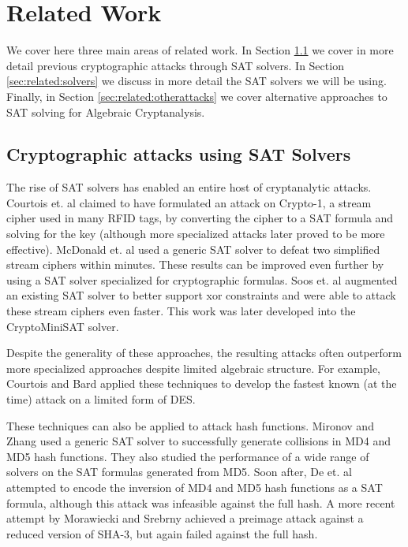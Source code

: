 \section{Related Work}
\label{sec:related}
We cover here three main areas of related work. In Section \ref{sec:related:satattacks} we cover in more detail previous cryptographic attacks through SAT solvers. In Section \ref{sec:related:solvers} we discuss in more detail the SAT solvers we will be using. Finally, in Section \ref{sec:related:otherattacks} we cover alternative approaches to SAT solving for Algebraic Cryptanalysis. 

\subsection{Cryptographic attacks using SAT Solvers}
\label{sec:related:satattacks}
The rise of SAT solvers has enabled an entire host of cryptanalytic attacks. Courtois et. al \cite{CNO08} claimed to have formulated an attack on Crypto-1, a stream cipher used in many RFID tags, by converting the cipher to a SAT formula and solving for the key (although more specialized attacks \cite{GGMRVSJ08} later proved to be more effective). McDonald et. al \cite{MCP07} used a generic SAT solver to defeat two simplified stream ciphers within minutes. These results can be improved even further by using a SAT solver specialized for cryptographic formulas. Soos et. al \cite{SNC09} augmented an existing SAT solver to better support xor constraints and were able to attack these stream ciphers even faster. This work was later developed into the {CryptoMiniSAT} solver.

Despite the generality of these approaches, the resulting attacks often outperform more specialized approaches despite limited algebraic structure. For example, Courtois and Bard \cite{CB07} applied these techniques to develop the fastest known (at the time) attack on a limited form of DES.

These techniques can also be applied to attack hash functions. Mironov and Zhang \cite{MZ06} used a generic SAT solver to successfully generate collisions in MD4 and MD5 hash functions. They also studied the performance of a wide range of solvers on the SAT formulas generated from MD5. Soon after, De et. al \cite{DKV07} attempted to encode the inversion of MD4 and MD5 hash functions as a SAT formula, although this attack was infeasible against the full hash. A more recent attempt by Morawiecki and Srebrny \cite{MS13} achieved a preimage attack against a reduced version of SHA-3, but again failed against the full hash.

